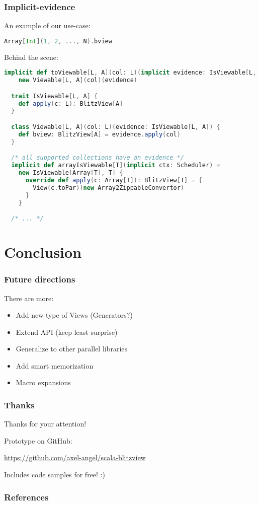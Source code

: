 \documentclass[12pt]{beamer}
\begin{document}
\begin{frame}[fragile]
    \frametitle{Implicit-evidence}
    An example of our use-case:
    \begin{lstlisting}[language=scala, basicstyle=\tiny]
  Array[Int](1, 2, ..., N).bview
    \end{lstlisting}

    Behind the scene:
    \begin{lstlisting}[language=scala, basicstyle=\tiny]
  implicit def toViewable[L, A](col: L)(implicit evidence: IsViewable[L, A]) =
    new Viewable[L, A](col)(evidence)

  trait IsViewable[L, A] {
    def apply(c: L): BlitzView[A]
  }

  class Viewable[L, A](col: L)(evidence: IsViewable[L, A]) {
    def bview: BlitzView[A] = evidence.apply(col)
  }

  /* all supported collections have an evidence */
  implicit def arrayIsViewable[T](implicit ctx: Scheduler) =
    new IsViewable[Array[T], T] {
      override def apply(c: Array[T]): BlitzView[T] = {
        View(c.toPar)(new Array2ZippableConvertor)
      }
    }

  /* ... */
    \end{lstlisting}
\end{frame}

\section{Conclusion}
\begin{frame}
    \frametitle{Future directions}
    There are more:
    \begin{itemize}
        \item Add new type of Views (Generators?)
        \item Extend API (keep least surprise)
        \item Generalize to other parallel libraries
        \item Add smart memorization
        \item Macro expansions
    \end{itemize}
\end{frame}

\begin{frame}
    \frametitle{Thanks}
    {\Huge Thanks for your attention!}

    Prototype on GitHub:

    \url{https://github.com/axel-angel/scala-blitzview}

    Includes code samples for free! :)
\end{frame}


\nocite{scala-bitrot}

\begin{frame}
    \frametitle<presentation>{References}
    
    
\end{frame}
\end{document}
